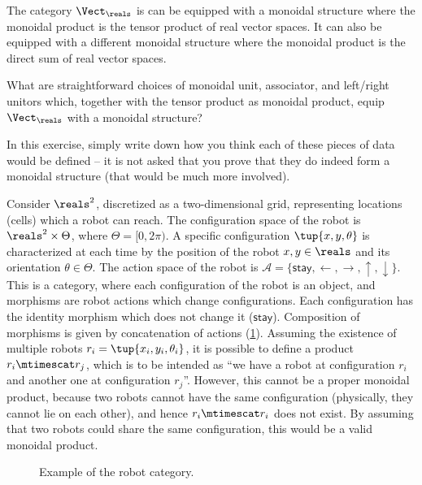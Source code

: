 \begin{example}
The category $\Vect_\reals$ is can be equipped with a monoidal structure where the monoidal product is the tensor product of real vector spaces. It can also be equipped with a different monoidal structure where the monoidal product is the direct sum of real vector spaces. 
\end{example}

\begin{gradedexercise}\label{ex:VectTensorMonStructure}
What are straightforward choices of monoidal unit, associator, and left/right unitors which, together with the tensor product as monoidal product, equip $\Vect_\reals$ with a monoidal structure? 

In this exercise, simply write down how you think each of these pieces of data would be defined -- it is not asked that you prove that they do indeed form a monoidal structure (that would be much more involved). 
\end{gradedexercise}



\begin{example}
  \label{ex:robot}
  Consider $\reals^2$, discretized as a two-dimensional grid, representing locations (cells) which a robot can reach. The configuration space of the robot is $\reals^2\times \Theta$, where $\Theta=[0,2\pi)$. A specific configuration $\tup{x,y,\theta}$ is characterized at each time by the position of the robot $x,y\in \reals$ and its orientation $\theta \in \Theta$. The action space of the robot is $\mathcal{A}=\{\mathsf{stay},\leftarrow, \rightarrow, \uparrow, \downarrow\}$. This is a category, where each configuration of the robot is an object, and morphisms are robot actions which change configurations. Each configuration has the identity morphism which does not change it ($\mathsf{stay}$). Composition of morphisms is given by concatenation of actions (\cref{fig:robotcategory}). Assuming the existence of multiple robots $r_i=\tup{x_i,y_i,\theta_i}$, it is possible to define a product $r_i\mtimescat r_j$, which is to be intended as ``we have a robot at configuration $r_i$ and another one at configuration $r_j$''. However, this cannot be a proper monoidal product, because two robots cannot have the same configuration (physically, they cannot lie on each other), and hence $r_i\mtimescat r_i$ does not exist. By assuming that two robots could share the same configuration, this would be a valid monoidal product.
  \begin{figure}[tbh]
    \begin{center}
    \end{center}
    \caption{Example of the robot category. \label{fig:robotcategory}}
  \end{figure}
\end{example}

